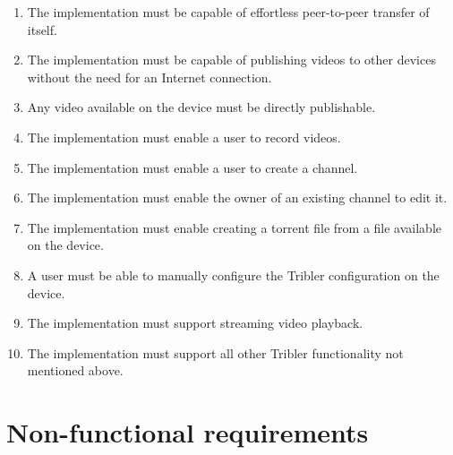 \begin{enumerate}[label=A\arabic*.,ref=A\arabic*]
	
	\item The implementation must be capable of effortless peer-to-peer transfer of itself.
	\item The implementation must be capable of publishing videos to other devices without the need for an Internet connection.
	\item Any video available on the device must be directly publishable. %
	\item The implementation must enable a user to record videos.
	\item The implementation must enable a user to create a channel.
	\item The implementation must enable the owner of an existing channel to edit it.
	\item The implementation must enable creating a torrent file from a file available on the device.
	\item A user must be able to manually configure the Tribler configuration on the device.
	\item The implementation must support streaming video playback.
	\item The implementation must support all other Tribler functionality not mentioned above.
	
\end{enumerate}


\section{Non-functional requirements}\label{sec:non_func_req}

